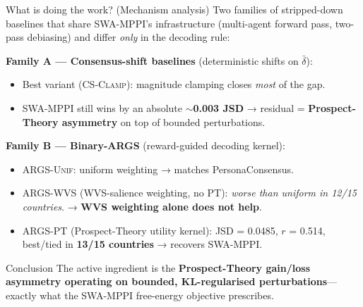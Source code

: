 \documentclass[10pt,aspectratio=169]{beamer}
\begin{document}
\begin{frame}{What is doing the work? (Mechanism analysis)}
  \footnotesize
  Two families of stripped-down baselines that share SWA-MPPI's infrastructure (multi-agent forward pass, two-pass debiasing) and differ \emph{only} in the decoding rule:

  \textbf{Family A — Consensus-shift baselines} (deterministic shifts on $\bar\delta$):
  \begin{itemize}
    \item Best variant (\textsc{CS-Clamp}): magnitude clamping closes \emph{most} of the gap.
    \item SWA-MPPI still wins by an absolute $\sim$\textbf{0.003 JSD} → residual = \textbf{Prospect-Theory asymmetry} on top of bounded perturbations.
  \end{itemize}

  \textbf{Family B — Binary-ARGS} (reward-guided decoding kernel):
  \begin{itemize}
    \item \textsc{ARGS-Unif}: uniform weighting → matches PersonaConsensus.
    \item \textsc{ARGS-WVS} (WVS-salience weighting, no PT): \emph{worse than uniform in 12/15 countries}. → \textbf{WVS weighting alone does not help}.
    \item \textsc{ARGS-PT} (Prospect-Theory utility kernel): JSD = 0.0485, $r$ = 0.514, best/tied in \textbf{13/15 countries} → recovers SWA-MPPI.
  \end{itemize}
  \begin{block}{\small Conclusion}
    The active ingredient is the \textbf{Prospect-Theory gain/loss asymmetry operating on bounded, KL-regularised perturbations}---exactly what the SWA-MPPI free-energy objective prescribes.
  \end{block}
\end{frame}
\end{document}
